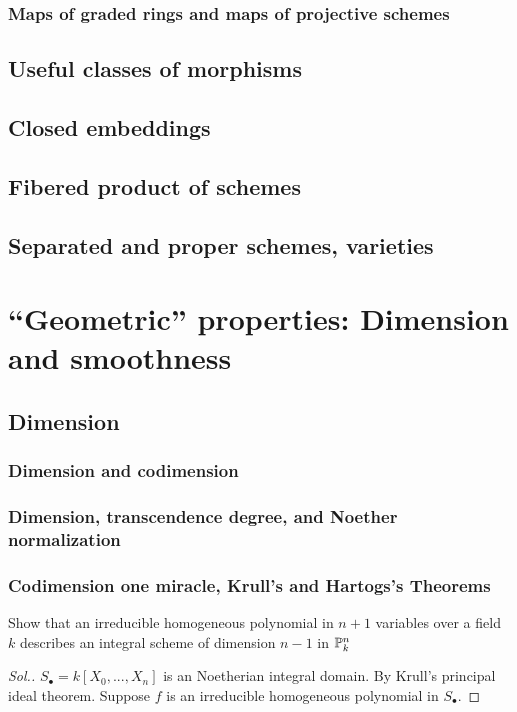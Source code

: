 \documentclass[11pt]{book} %
\begin{document}
\section{Maps of graded rings and maps of projective schemes}

\chapter{Useful classes of morphisms}
\chapter{Closed embeddings}
\chapter{Fibered product of schemes}
\chapter{Separated and proper schemes, varieties}
\part{``Geometric'' properties: Dimension and smoothness}
\chapter{Dimension}
\section{Dimension and codimension}
\section{Dimension, transcendence degree, and Noether normalization}
\section{Codimension one miracle, Krull's and Hartogs's Theorems}
\begin{exr}
Show that an irreducible homogeneous polynomial in $n+1$ variables over a field $k$ describes an integral scheme of dimension $n-1$ in $\mathbb P^n_k$ 
\end{exr}
\begin{proof}[Sol.]
$S_\bullet=k[X_0,...,X_n]$ is an Noetherian integral domain. By Krull's principal ideal theorem. Suppose $f$ is an irreducible homogeneous polynomial in $S_\bullet$.
\end{proof}
\end{document}
